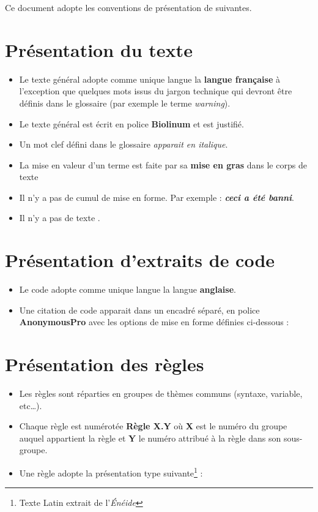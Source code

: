 Ce document adopte les conventions de présentation de suivantes. \medskip

\section{Présentation du texte}

\begin{itemize}
\item Le texte général adopte comme unique langue la \textbf{langue française} à l’exception que quelques mots issus du jargon technique qui devront être définis dans le glossaire (par exemple le terme \textit{warning}).
\item Le texte général est écrit en police \textbf{Biolinum} et est justifié.
\item Un mot clef défini dans le glossaire \textit{apparait en italique}.
\item La mise en valeur d’un terme est faite par sa \textbf{mise en gras} dans le corps de texte
\item Il n’y a pas de cumul de mise en forme. Par exemple : \textbf{\textit{ceci a été banni}}.
\item Il n’y a pas de texte .
\end{itemize}
\bigskip

\section{Présentation d'extraits de code}

\begin{itemize}
\item Le code adopte comme unique langue la langue \textbf{anglaise}.
\item Une citation de code apparait dans un encadré séparé, en police {\selectfont\textbf{AnonymousPro}} avec les options de mise en forme définies ci-dessous :
\end{itemize}


% 

\pagebreak

\section{Présentation des règles}

\begin{itemize}
\item Les règles sont réparties en groupes de thèmes communs (syntaxe, variable, etc…).
\item Chaque règle est numérotée \textbf{Règle X.Y} où \textbf{X} est le numéro du groupe auquel appartient la règle et \textbf{Y} le numéro attribué à la règle dans son sous-groupe.
\item Une règle adopte la présentation type suivante\footnote{Texte Latin extrait de l’\textit{Énéide}} :
\end{itemize}


